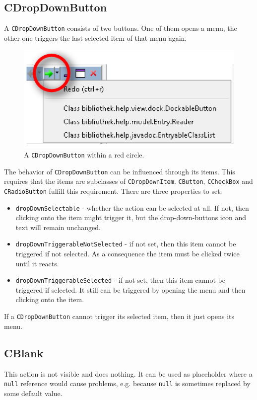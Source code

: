\documentclass[a4paper,10pt]{article}
\newcommand{\src}[1]{\texttt{#1}}
\begin{document}
\subsection{CDropDownButton}
A \src{CDropDownButton} consists of two buttons. One of them opens a menu, the other one triggers the last selected item of that menu again. 

\begin{figure}[ht]
\centering
\includegraphics[scale=1]{cdropdown}
\caption{A \src{CDropDownButton} within a red circle.}
\label{fig:cdropdown}
\end{figure}

The behavior of \src{CDropDownButton} can be influenced through its items. This requires that the items are subclasses of \src{CDropDownItem}. \src{CButton}, \src{CCheckBox} and \src{CRadioButton} fulfill this requirement. There are three properties to set:
\begin{itemize}
 \item \src{dropDownSelectable} - whether the action can be selected at all. If not, then clicking onto the item might trigger it, but the drop-down-buttons icon and text will remain unchanged.
 \item \src{dropDownTriggerableNotSelected} - if not set, then this item cannot be triggered if not selected. As a consequence the item must be clicked twice until it reacts.
 \item \src{dropDownTriggerableSelected} - if not set, then this item cannot be triggered if selected. It still can be triggered by opening the menu and then clicking onto the item.
\end{itemize}
If a \src{CDropDownButton} cannot trigger its selected item, then it just opens its menu.

\subsection{CBlank}
This action is not visible and does nothing. It can be used as placeholder where a \src{null} reference would cause problems, e.g. because \src{null} is sometimes replaced by some default value.
\end{document}
